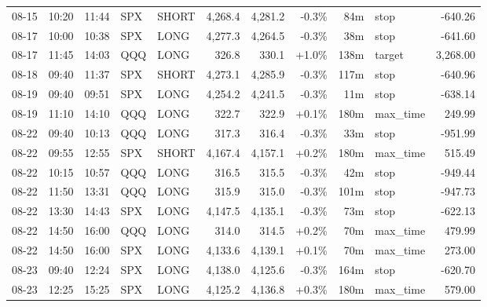 \documentclass[11pt,a4paper,twoside]{article}
\begin{document}
\begin{center}
\begin{longtable}{>{\color{txtmain}}l l l l l r r r r >{\color{txtmain}}l r}
08-15 & 10:20 & 11:44 & SPX & SHORT & 4,268.4 & 4,281.2 & \textcolor{lossred}{-0.3\%} & 84m & stop & \textcolor{lossred}{-640.26} \\
08-17 & 10:00 & 10:38 & SPX & LONG & 4,277.3 & 4,264.5 & \textcolor{lossred}{-0.3\%} & 38m & stop & \textcolor{lossred}{-641.60} \\
08-17 & 11:45 & 14:03 & QQQ & LONG & 326.8 & 330.1 & \textcolor{wingreen}{+1.0\%} & 138m & target & \textcolor{wingreen}{3,268.00} \\
08-18 & 09:40 & 11:37 & SPX & SHORT & 4,273.1 & 4,285.9 & \textcolor{lossred}{-0.3\%} & 117m & stop & \textcolor{lossred}{-640.96} \\
08-19 & 09:40 & 09:51 & SPX & LONG & 4,254.2 & 4,241.5 & \textcolor{lossred}{-0.3\%} & 11m & stop & \textcolor{lossred}{-638.14} \\
08-19 & 11:10 & 14:10 & QQQ & LONG & 322.7 & 322.9 & \textcolor{wingreen}{+0.1\%} & 180m & max\_time & \textcolor{wingreen}{249.99} \\
08-22 & 09:40 & 10:13 & QQQ & LONG & 317.3 & 316.4 & \textcolor{lossred}{-0.3\%} & 33m & stop & \textcolor{lossred}{-951.99} \\
08-22 & 09:55 & 12:55 & SPX & SHORT & 4,167.4 & 4,157.1 & \textcolor{wingreen}{+0.2\%} & 180m & max\_time & \textcolor{wingreen}{515.49} \\
08-22 & 10:15 & 10:57 & QQQ & LONG & 316.5 & 315.5 & \textcolor{lossred}{-0.3\%} & 42m & stop & \textcolor{lossred}{-949.44} \\
08-22 & 11:50 & 13:31 & QQQ & LONG & 315.9 & 315.0 & \textcolor{lossred}{-0.3\%} & 101m & stop & \textcolor{lossred}{-947.73} \\
08-22 & 13:30 & 14:43 & SPX & LONG & 4,147.5 & 4,135.1 & \textcolor{lossred}{-0.3\%} & 73m & stop & \textcolor{lossred}{-622.13} \\
08-22 & 14:50 & 16:00 & QQQ & LONG & 314.0 & 314.5 & \textcolor{wingreen}{+0.2\%} & 70m & max\_time & \textcolor{wingreen}{479.99} \\
08-22 & 14:50 & 16:00 & SPX & LONG & 4,133.6 & 4,139.1 & \textcolor{wingreen}{+0.1\%} & 70m & max\_time & \textcolor{wingreen}{273.00} \\
08-23 & 09:40 & 12:24 & SPX & LONG & 4,138.0 & 4,125.6 & \textcolor{lossred}{-0.3\%} & 164m & stop & \textcolor{lossred}{-620.70} \\
08-23 & 12:25 & 15:25 & SPX & LONG & 4,125.2 & 4,136.8 & \textcolor{wingreen}{+0.3\%} & 180m & max\_time & \textcolor{wingreen}{579.00} \\

\end{longtable}
\end{center}
\end{document}
